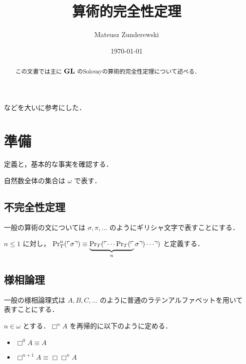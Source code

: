 \documentclass{jlreq}
\title{算術的完全性定理}
\author{Mateusz Zunderewski}
\date{\today}
\begin{document}
\maketitle

\begin{abstract}
	この文書では主に $\mathbf{GL}$ のSolovayの算術的完全性定理について述べる．
\end{abstract}

\setcounter{tocdepth}{3}
\tableofcontents

\pagebreak

\cite{数学基礎論増補版,数学における証明と真理}などを大いに参考にした．

\section{準備}

定義と，基本的な事実を確認する．

\begin{notation}
	自然数全体の集合は $\omega$ で表す．
\end{notation}

\subsection{不完全性定理}

\begin{notation}
	一般の算術の文については $\sigma, \pi, \dots$ のようにギリシャ文字で表すことにする．
\end{notation}

\begin{definition}
	$n \leq 1$ に対し，
	$\mathrm{Pr}_T^n(\ulcorner \sigma \urcorner) \equiv \underbrace{\mathrm{Pr}_T(\ulcorner \cdots \mathrm{Pr}_T(\ulcorner}_{n} \sigma \urcorner) \cdots \urcorner)$ と定義する．
\end{definition}


\subsection{様相論理}

\begin{notation}
	一般の様相論理式は $A,B,C,\dots$ のように普通のラテンアルファベットを用いて表すことにする．
\end{notation}

\begin{definition}
	$n \in \omega$ とする．$\Box^n A$ を再帰的に以下のように定める．
	\begin{itemize}
		\item $\Box^0 A \equiv A$
		\item $\Box^{n+1} A \equiv \Box \Box^n A$
	\end{itemize}
\end{definition}
\end{document}
